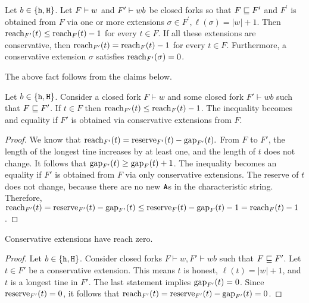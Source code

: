 \begin{fact}\label{fact:reach-fork-ext-mh}
  Let $b \in \{\mathtt{h}, \mathtt{H}\}$. 
  Let $F \vdash w$ and $F^\prime \vdash wb$ be closed forks so that 
  $F \sqsubseteq F^\prime$ and 
  $F^\prime$ is obtained from $F$ via one or more extensions 
  $\sigma \in F^\prime, \ell(\sigma) = |w| + 1$.
  Then $\operatorname{reach}_{F^\prime}(t) \leq \operatorname{reach}_F(t) - 1$ for every $t \in F$. 
  If all these extensions are conservative, then 
  $\operatorname{reach}_{F^\prime}(t) = \operatorname{reach}_F(t) - 1$ for every $t \in F$. 
  Furthermore, a conservative extension $\sigma$ satisfies 
  $\operatorname{reach}_{F^\prime}(\sigma) = 0$.
\end{fact}
The above fact follows from the claims below.
\begin{claim}\label{claim:nex-mh}
  Let $b \in \{\mathtt{h}, \mathtt{H}\}$. 
  Consider a closed fork $F\vdash w$ and some closed fork $F'\vdash wb$ such that $F\sqsubseteq F'$. 
  If $t \in F$ then 
  $\operatorname{reach}_{F'}(t)\leq \operatorname{reach}_{F}(t) - 1$. 
  The inequality becomes and equality 
  if $F'$ is obtained via 
  conservative extensions from $F$.
\end{claim}
\begin{proof}
  We know that $\operatorname{reach}_{F'}(t)=\operatorname{reserve}_{F'}(t)-\operatorname{gap}_{F'}(t).$ From $F$ to $F'$, the length of the longest tine increases by at least one, and the length of $t$ does not change. 
  It follows that $\operatorname{gap}_{F'}(t) \geq \operatorname{gap}_{F}(t) + 1$. 
  The inequality becomes an equality 
  if $F'$ is obtained from $F$ via only conservative extensions. 
  The reserve of $t$ does not change, because there are no new $\mathtt{A}$s in the characteristic string. Therefore, 
  $
    \operatorname{reach}_{F'}(t)
    =\operatorname{reserve}_{F'}(t)-\operatorname{gap}_{F'}(t)
    \leq \operatorname{reserve}_{F}(t)-\operatorname{gap}_{F}(t) - 1
    =\operatorname{reach}_{F}(t) - 1
  $. 
\end{proof}
\begin{claim}\label{claim:ex-mh}
  Conservative extensions have reach zero.
\end{claim}
\begin{proof}
  Let $b \in \{\mathtt{h}, \mathtt{H}\}$. 
  Consider closed forks $F\vdash w, F'\vdash wb$ 
  such that $F\sqsubseteq F'$. 
  Let $t \in F'$ be a conservative extension. 
  This means $t$ is honest, $\ell(t) = |w| + 1$, 
  and 
  $t$ is a longest tine in $F'$. 
  The last statement implies $\operatorname{gap}_{F'}(t)=0$. 
  Since $\operatorname{reserve}_{F'}(t)=0$, it follows that 
  $\operatorname{reach}_{F'}(t)=\operatorname{reserve}_{F'}(t)-\operatorname{gap}_{F'}(t) = 0$. 
\end{proof}


